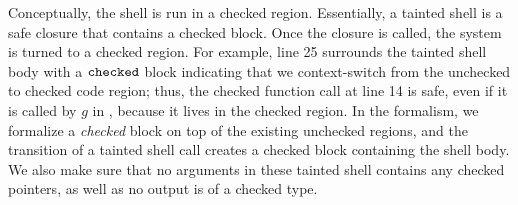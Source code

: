 Conceptually, the shell is run in a checked region.
Essentially, a tainted shell is a safe closure that contains a checked block.
Once the closure is called, the system is turned to a checked region.
For example,  line 25 surrounds the tainted shell body with a $\mathtt{checked}$ block indicating
that we context-switch from the unchecked to checked code region;
thus, the checked function call at  line 14 is safe, 
even if it is called by $g$ in  , because it lives in the checked region.
In the \systemname formalism, we formalize a \textit{checked} block on top of the existing unchecked regions,
and the transition of a tainted shell call creates a checked block containing the shell body.
We also make sure that no arguments in these tainted shell contains any checked pointers,
as well as no output is of a checked type.

  

